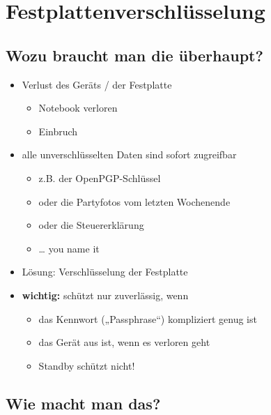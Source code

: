 \section{Festplattenverschlüsselung}

\subsection{Wozu braucht man die überhaupt?}

\begin{frame}
  \begin{itemize}
    \item Verlust des Geräts / der Festplatte
      \begin{itemize}
	\item Notebook verloren
	\item Einbruch
      \end{itemize}
    \item alle unverschlüsselten Daten sind sofort zugreifbar
      \begin{itemize}[<+->]
	\item z.B. der OpenPGP-Schlüssel
	\item oder die Partyfotos vom letzten Wochenende
	\item oder die Steuererklärung
	\item … you name it
      \end{itemize}
  \end{itemize}

\end{frame}

\begin{frame}
  \begin{itemize}
    \item Lösung: Verschlüsselung der Festplatte
    \item \textbf{wichtig:} schützt nur zuverlässig, wenn
      \begin{itemize}
	\item das Kennwort („Passphrase“) kompliziert genug ist
	\item das Gerät aus ist, wenn es verloren geht
	\item Standby schützt nicht!
      \end{itemize}
  \end{itemize}

\end{frame}

\subsection{Wie macht man das?}


